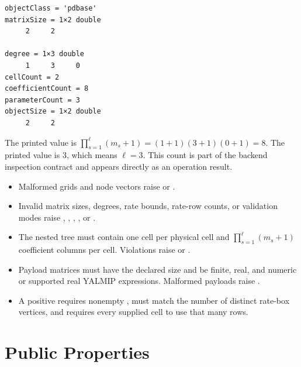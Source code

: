 \begin{lstlisting}[style=dpoutput]
objectClass = 'pdbase'
matrixSize = 1×2 double
     2     2

degree = 1×3 double
     1     3     0
cellCount = 2
coefficientCount = 8
parameterCount = 3
objectSize = 1×2 double
     2     2
\end{lstlisting}

The printed  value is $\prod_{s=1}^{\ell}(m_s+1)=(1+1)(3+1)(0+1)=8$. The printed  value is $3$, which means $\ell=3$. This count is part of the backend inspection contract and appears directly as an operation result.

\remarkshead
\begin{itemize}[leftmargin=*]
    \item Malformed grids and node vectors raise  or \allowbreak{}. \item Invalid matrix sizes, degrees, rate bounds, rate-row counts, or validation modes raise \allowbreak{}, , \allowbreak{}, \allowbreak{}, or \allowbreak{}. \item The nested tree must contain one cell per physical cell and $\prod_{s=1}^{\ell}(m_s+1)$ coefficient columns per cell. Violations raise \allowbreak{} or \allowbreak{}. \item Payload matrices must have the declared size and be finite, real, and numeric or supported real YALMIP expressions. Malformed payloads raise \allowbreak{}. \item A positive  requires nonempty , must match the number of distinct rate-box vertices, and requires every supplied cell to use that many rows.
\end{itemize}

\section{Public Properties}
\label{sec:pdbase-fields}

